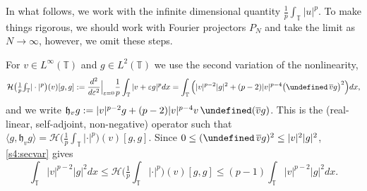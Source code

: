 \documentclass[letterpaper, 11pt,  reqno]{amsart}
\theoremstyle{definition}
\newcommand{\1}{\mathbbm 1}
\newcommand{\T}{\mathbb{T}}
\newcommand{\0}{\mathbf 0}
\let\P= \undefined
\newcommand{\P}{\mathbb{P}}
\newcommand{\E}{\mathbb{E}}
\newcommand{\nb}{\nabla}
\newcommand{\ep}{\varepsilon}
\newcommand{\cj}{\overline}
\newcommand{\jb}[1]
{\langle #1 \rangle}
\newcommand{\ind}{\mathbbm 1}
\newcommand{\ph}{\varphi}
\newcommand{\eps}{\ep}
\numberwithin{equation}{section}
\numberwithin{theorem}{section}
\let\Re=\undefined\DeclareMathOperator*{\Re}{Re}
\newcommand{\HF}[2]{\mathcal H\big(\tfrac1p{\textstyle\int_\T}|\cdot|^p\big)(#1)[#2]}
\begin{document}

 
In what follows, we work with the infinite dimensional quantity $\frac1p \int_\T |u|^p$. To make things  rigorous, we should work with Fourier projectors $P_N$ and take the limit as $N\to \infty$, however, we omit these steps. %
 
For $v\in L^\infty(\T)$ and $g\in L^2(\T)$ we use the second variation of the
nonlinearity,
\begin{equation}\label{s4:secvar}
\HF{v}{g,g}:=\frac{d^2}{d\eps^2}\Big|_{\eps=0}\frac1p\int_\T|v+\eps g|^pdx
=\int_\T\Big(|v|^{p-2}|g|^2+(p-2)|v|^{p-4}\big(\Re\,\cj vg\big)^2\Big)dx ,
\end{equation}
and we write $\mathfrak h_v g:=|v|^{p-2}g+(p-2)|v|^{p-4}v\,\Re(\cj vg)$. This is the
(real-linear, self-adjoint, non-negative) operator such that
$\jb{g,\mathfrak h_vg}=\HF{v}{g,g}$. Since $0\le(\Re\,\cj vg)^2\le|v|^2|g|^2$, \eqref{s4:secvar} gives
\begin{equation} \label{HintUB}
    \int_\T|v|^{p-2}|g|^2dx\le\HF{v}{g,g}\le(p-1)\int_\T|v|^{p-2}|g|^2dx .
\end{equation}
\end{document}
